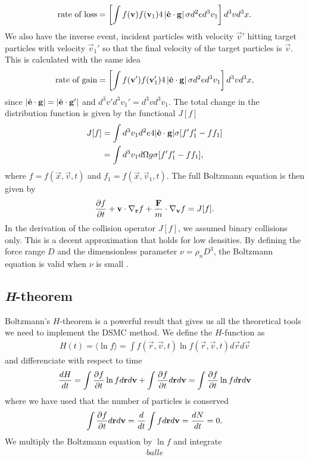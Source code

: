 \begin{align}
	\text{rate of loss} = \left[\int f(\mathbf v)f(\mathbf v_1)4\left|\hat {\mathbf{e}} \cdot \mathbf g \right|\sigma d^2 ed^3 v_1\right]d^3 vd^3 x.
\end{align}
We also have the inverse event, incident particles with velocity $\vec v'$ hitting target particles with velocity $\vec v_1'$ so that the final velocity of the target particles is $\vec v$. This is calculated with the same idea
\begin{align}
	\text{rate of gain} = \left[\int f(\mathbf v')f(\mathbf v_1')4\left|\hat {\mathbf{e}} \cdot \mathbf g \right|\sigma d^2 ed^3 v_1\right]d^3 vd^3 x,
\end{align}
since $|\hat {\mathbf{e}}\cdot \mathbf g| = |\hat {\mathbf{e}}\cdot \mathbf g'|$ and $d^3 v'd^3 v_1' = d^3 vd^3 v_1$. The total change in the distribution function is given by the functional $J[f]$
\begin{align}
	J[f] &= \int d^3 v_1 d^2 e4|\hat {\mathbf{e}}\cdot\mathbf g|\sigma[f'f_1' - ff_1]\\
	&= \int d^3 v_1 d\Omega g \sigma[f'f_1' - ff_1],
\end{align}
where $f = f(\vec x, \vec v, t)$ and $f_1 = f(\vec x, \vec v_1, t)$. The full Boltzmann equation is then given by
\begin{align}
	\label{eq:boltzmann_equation}
	\frac{\partial f}{\partial t} + \mathbf v\cdot \nabla_\mathbf r f + \frac{\mathbf F}{ m}\cdot\nabla_\mathbf v f = J[f].
\end{align}
In the derivation of the collision operator $J[f]$, we assumed binary collisions only. This is a decent approximation that holds for low densities. By defining the force range $D$ and the dimensionless parameter $\nu = \rho_n D^3$, the Boltzmann equation is valid when $\nu$ is small \cite{mclennan1989introduction}. 
\subsection{\textit{H}-theorem}
Boltzmann's $H$-theorem is a powerful result that gives us all the theoretical tools we need to implement the DSMC method. We define the $H$-function as
\begin{align}
	H(t) = \langle \ln f \rangle = \int f(\vec r, \vec v, t)\ln f(\vec r, \vec v, t)d\vec r d\vec v
\end{align}
and differenciate with respect to time
\begin{align}
	\frac{dH}{dt} = \int \frac{\partial f}{\partial t}\ln f d\mathbf r d\mathbf v + \int \frac{\partial f}{\partial t} d\mathbf r d\mathbf v = \int \frac{\partial f}{\partial t}\ln f d\mathbf r d\mathbf v
\end{align}
where we have used that the number of particles is conserved
\begin{align}
	\int \frac{\partial f}{\partial t}d\mathbf r d\mathbf v = \frac{d}{dt} \int fd\mathbf r d\mathbf v = \frac{dN}{dt} = 0.
\end{align}
We multiply the Boltzmann equation by $\ln f$ and integrate
\begin{align}
	balle
\end{align}

